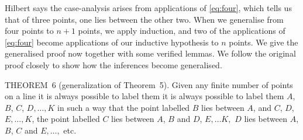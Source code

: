 Hilbert says the case-analysis arises from applications of \ref{eq:four}, which tells us that of three points, one lies between the other two. When we generalise from four points to $n+1$ points, we apply induction, and two of the applications of \ref{eq:four} become applications of our inductive hypothesis to $n$ points. We give the generalised proof now together with some verified lemmas. We follow the original proof closely to show how the inferences become generalised.

\begin{proposition}
THEOREM~6 (generalization of Theorem~5). Given any finite number of points on a line it is always possible to label them it is always possible to label them $A$, $B$, $C$, $D, \ldots, K$ in such a way that the point labelled $B$ lies between $A$, and $C$, $D$, $E, \ldots, K$, the point labelled $C$ lies between $A$, $B$ and $D$, $E,\ldots K,$ $D$ lies between $A$, $B$, $C$ and $E, \ldots,$ etc.
\end{proposition}
